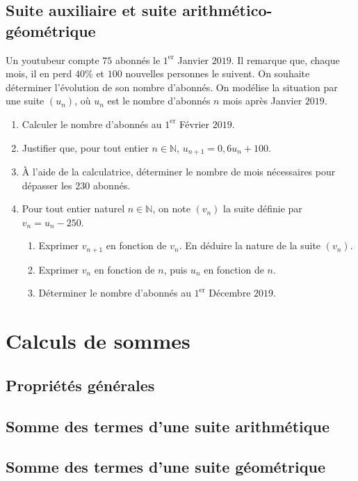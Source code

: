 \documentclass[11pt]{article}
\begin{document}
\subsection{Suite auxiliaire et suite arithmético-géométrique}
\begin{app}
  Un youtubeur compte $75$ abonnés le $1^\text{er}$ Janvier $2019$. Il remarque
  que, chaque mois, il en perd $40$\% et $100$ nouvelles personnes le suivent.
  On souhaite déterminer l'évolution de son nombre d'abonnés. On modélise la
  situation par une suite $\left( u_n \right)$, où $u_n$ est le nombre d'abonnés
  $n$ mois après Janvier $2019$.
  \begin{enumerate}
    \item Calculer le nombre d'abonnés au $1^\text{er}$ Février $2019$.
    \item Justifier que, pour tout entier $n\in\mathbb{N}$,
      $u_{n+1}=0,6u_n+100$.
    \item À l'aide de la calculatrice, déterminer le nombre de mois nécessaires
      pour dépasser les $230$ abonnés.
    \item Pour tout entier naturel $n\in\mathbb{N}$, on note $\left( v_n
      \right)$ la suite définie par $v_n = u_n-250$.
      \begin{enumerate}
        \item Exprimer $v_{n+1}$ en fonction de $v_n$. En déduire la nature de
          la suite $\left( v_n \right)$.
        \item Exprimer $v_n$ en fonction de $n$, puis $u_n$ en fonction de $n$.
        \item Déterminer le nombre d'abonnés au $1^\text{er}$ Décembre $2019$.
      \end{enumerate}
  \end{enumerate}
\end{app}

\section{Calculs de sommes}
\subsection{Propriétés générales}
\subsection{Somme des termes d'une suite arithmétique}
\subsection{Somme des termes d'une suite géométrique}
\end{document}
